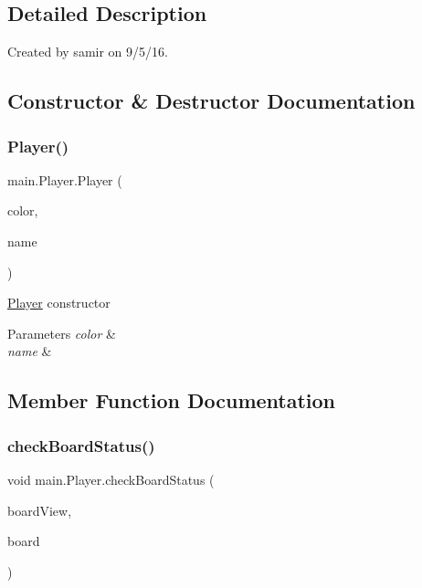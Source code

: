 \subsection{Detailed Description}
Created by samir on 9/5/16. 

\subsection{Constructor \& Destructor Documentation}
\hypertarget{classmain_1_1_player_a7a07b12fa4f52134a9b68abf32b0cb65}{}\label{classmain_1_1_player_a7a07b12fa4f52134a9b68abf32b0cb65} 
\subsubsection{\texorpdfstring{Player()}{Player()}}
{\footnotesize\ttfamily main.\+Player.\+Player (\begin{DoxyParamCaption}\item[{String}]{color,  }\item[{String}]{name }\end{DoxyParamCaption})}

\hyperlink{classmain_1_1_player}{Player} constructor 
\begin{DoxyParams}{Parameters}
{\em color} & \\
\hline
{\em name} & \\
\hline
\end{DoxyParams}


\subsection{Member Function Documentation}
\hypertarget{classmain_1_1_player_a20e4d2604d95857e73ba9ce628b2037b}{}\label{classmain_1_1_player_a20e4d2604d95857e73ba9ce628b2037b} 
\subsubsection{\texorpdfstring{check\+Board\+Status()}{checkBoardStatus()}}
{\footnotesize\ttfamily void main.\+Player.\+check\+Board\+Status (\begin{DoxyParamCaption}\item[{\hyperlink{classmain_1_1_board_view}{Board\+View}}]{board\+View,  }\item[{\hyperlink{classmain_1_1model_1_1_board}{Board}}]{board }\end{DoxyParamCaption})}

